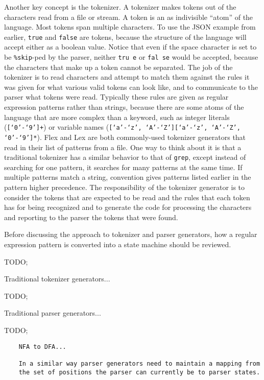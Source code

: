 {	Another key concept is the tokenizer. A tokenizer makes tokens out of
	the characters read from a file or stream.
	A token is an as indivisible ``atom'' of
	the language. Most tokens span multiple characters.
	To use the JSON example from earlier, \texttt{true}
	and \texttt{false} are tokens, because the structure of the language
	will accept either as a boolean value. Notice that even if
	the space character is set to be \texttt{\%skip}-ped by the parser,
	neither \texttt{tru e} or \texttt{fal se} would be accepted, because
	the characters that make up a token cannot be separated. The job of the
	tokenizer is to read characters and
	attempt to match them against the rules it was given for what various
	valid tokens can look like, and to communicate to the parser what
	tokens were read.
	Typically these rules are given as regular expression patterns rather
	than strings, because there are some atoms of the language that
	are more complex than a keyword, such as integer
	literals (\texttt{[`0'-`9']+}) or variable
	names (\texttt{[`a'-`z', `A'-`Z'][`a'-`z', `A'-`Z', `0'-`9']*}).
	Flex and Lex are both commonly-used
	tokenizer generators that read in their list of patterns from a file.
	One way to think about it is that a
	traditional tokenizer has a similar behavior
	to that of \texttt{grep}, except instead of searching for one pattern, it
	searches for many patterns at the same time.
	If multiple patterns match a string, convention gives patterns listed
	earlier in the pattern higher precedence.
	The responsibility of
	the tokenizer generator is to consider the tokens that
	are expected to be read and the rules that each token has for being
	recognized and to generate the code for processing the characters
	and reporting to the parser the tokens that were found.
	
	Before discussing the approach
	to tokenizer and parser generators, how a regular expression
	pattern is converted into a state machine should be reviewed.
	
	TODO;
	
	Traditional tokenizer generators...
	
	TODO;
	
	Traditional parser generators...
	
	TODO;
	
	\begin{verbatim}
	NFA to DFA...
	
	In a similar way parser generators need to maintain a mapping from
	the set of positions the parser can currently be to parser states.
	

\end{verbatim}}

